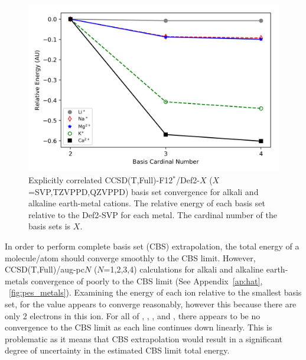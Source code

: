 \begin{figure}[!htbp]
  \centering
    \includegraphics[width=\textwidth]{figures/ap_metals_explicit}
    \caption[Explicitly correlated basis set convergence for alkali and
    alkaline earth-metal cations.]{Explicitly correlated
    CCSD(T,Full)-F12$^*$/Def2-$X$ ($X$=SVP,TZVPPD,QZVPPD) basis set convergence
    for alkali and alkaline earth-metal cations. The relative energy of each
    basis set relative to the Def2-SVP for each metal. The cardinal number of
    the basis sets is $X$.} \label{fig:metals_explicit}
\end{figure}

In order to perform complete basis set (CBS) extrapolation, the total energy of
a molecule/atom should converge smoothly to the CBS limit.\cite{Truhlar1998}
However, CCSD(T,Full)/aug-pc$N$ ($N$=1,2,3,4) calculations for alkali and
alkaline earth-metals convergence of poorly to the CBS limit (See
Appendix~\ref{ap:hat}, ~\ref{fig:pes_metals}). Examining the energy of each ion
relative to the smallest basis set, for  the value appears to converge
reasonably, however this because there are only 2 electrons in this ion. For
all of , , , and , there appears to be
no convergence to the CBS limit as each line continues down linearly. This is
problematic as it means that CBS extrapolation would result in a significant
degree of uncertainty in the estimated CBS limit total energy.

